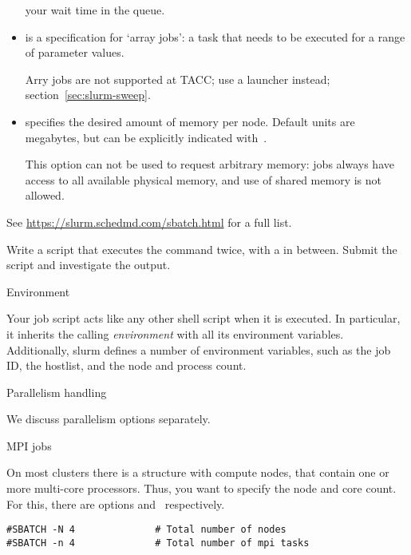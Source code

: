 \begin{itemize}
  your wait time in the queue.
\item {} is a specification for `array jobs': a task that needs
  to be executed for a range of parameter values.
  \begin{taccnote}
  Arry jobs are not supported at TACC; use a launcher instead;
  section~\ref{sec:slurm-sweep}.
  \end{taccnote}
\item {} specifies the desired amount of memory per node.
  Default units are megabytes, but can be explicitly indicated
  with~.
  \begin{taccnote}
    This option can not be used to request arbitrary memory:
    jobs always have access to all available physical memory,
    and use of shared memory is not allowed.
  \end{taccnote}
\end{itemize}
See \url{https://slurm.schedmd.com/sbatch.html} for a full list.

\begin{exercise}
  Write a script that executes the  command twice,
  with a  in between.
  Submit the script and investigate the output.
\end{exercise}

 {Environment}

Your job script acts like any other shell script when it is executed.
In particular, it inherits the calling
\emph{environment}
with all its environment variables.
Additionally, slurm defines a number of environment variables,
such as the job ID, the hostlist, and the node and process count.

 {Parallelism handling}

We discuss parallelism options separately.

 {MPI jobs}

On most clusters there is a structure with compute nodes,
that contain one or more multi-core processors.
Thus, you want to specify the node and core count.
For this, there are options  and~ respectively.

\begin{verbatim}
#SBATCH -N 4              # Total number of nodes
#SBATCH -n 4              # Total number of mpi tasks
\end{verbatim}

